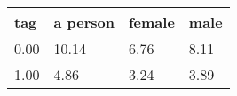 \begin{tabular}{llll}
\toprule
tag & a person & female & male \\
\midrule
0.00 & 10.14 & 6.76 & 8.11 \\
1.00 & 4.86 & 3.24 & 3.89 \\
\bottomrule
\end{tabular}
